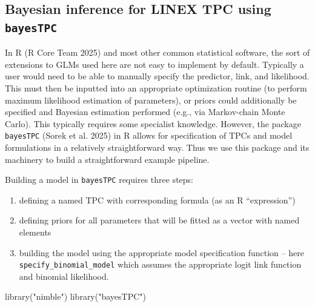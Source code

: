 \documentclass[
  12pt,
]{article}
\newenvironment{Shaded}{\begin{snugshade}}{\end{snugshade}}
\newcommand{\FunctionTok}[1]{\textcolor[rgb]{0.28,0.35,0.67}{#1}}
\newcommand{\NormalTok}[1]{\textcolor[rgb]{0.00,0.23,0.31}{#1}}
\newcommand{\StringTok}[1]{\textcolor[rgb]{0.13,0.47,0.30}{#1}}
\providecommand{\tightlist}{%
  \setlength{\itemsep}{0pt}\setlength{\parskip}{0pt}}
\begin{document}
\subsection{\texorpdfstring{Bayesian inference for LINEX TPC using
\texttt{bayesTPC}}{Bayesian inference for LINEX TPC using bayesTPC}}\label{bayesian-inference-for-linex-tpc-using-bayestpc}

In R (R Core Team 2025) and most other common statistical software, the
sort of extensions to GLMs used here are not easy to implement by
default. Typically a user would need to be able to manually specify the
predictor, link, and likelihood. This must then be inputted into an
appropriate optimization routine (to perform maximum likelihood
estimation of parameters), or priors could additionally be specified and
Bayesian estimation performed (e.g., via Markov-chain Monte Carlo). This
typically requires some specialist knowledge. However, the package
\texttt{bayesTPC} (Sorek et al. 2025) in R allows for specification of
TPCs and model formulations in a relatively straightforward way. Thus we
use this package and its machinery to build a straightforward example
pipeline.

Building a model in \texttt{bayesTPC} requires three steps:

\begin{enumerate}
\def\labelenumi{\arabic{enumi})}
\tightlist
\item
  defining a named TPC with corresponding formula (as an R
  ``expression'')
\item
  defining priors for all parameters that will be fitted as a vector
  with named elements
\item
  building the model using the appropriate model specification function
  -- here \texttt{specify\_binomial\_model} which assumes the
  appropriate logit link function and binomial likelihood.
\end{enumerate}

\begin{Shaded}
\begin{Highlighting}[]
\FunctionTok{library}\NormalTok{(}\StringTok{"nimble"}\NormalTok{)}
\FunctionTok{library}\NormalTok{(}\StringTok{"bayesTPC"}\NormalTok{)}
\end{Highlighting}
\end{Shaded}
\end{document}
